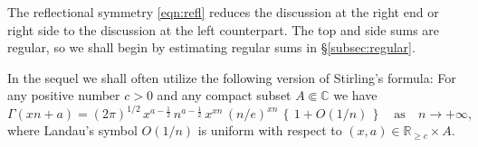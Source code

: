 \documentclass[a4paper,12pt]{article}
\theoremstyle{plain}
\def\C{\mathbb{C}}
\def\R{\mathbb{R}}
\def\vG{\varGamma}
\begin{document}
The reflectional symmetry \eqref{eqn:refl} reduces the discussion 
at the right end or right side to the discussion at the left counterpart.     
The top and side sums are regular, so we shall begin by estimating regular 
sums in \S \ref{subsec:regular}. 
\par
In the sequel we shall often utilize the following version of Stirling's formula:    
For any positive number $c > 0$ and any compact subset $A \Subset \C$ we have     
\begin{equation} \label{eqn:stirling} 
\vG( x n + a ) = (2 \pi)^{1/2} \, x^{a- \frac{1}{2} } \, n^{a- \frac{1}{2} } \, x^{x n} \, (n/e)^{x n} \,  
\left\{ \, 1 + O( 1/n ) \, \right\} \quad \mbox{as} \quad n \to +\infty, 
\end{equation}
where Landau's symbol $O(1/n)$ is uniform with respect to 
$(x, a) \in \R_{\ge c} \times A$.  
\end{document}

